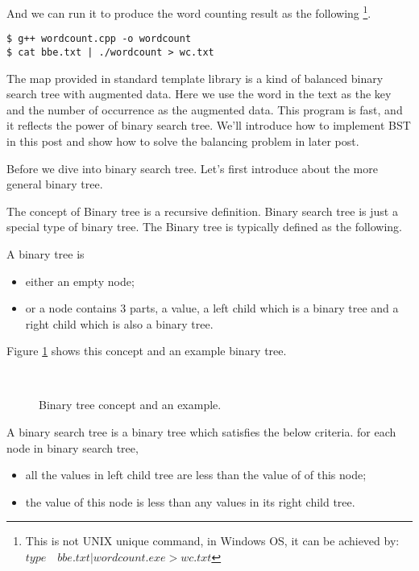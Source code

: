 \documentclass{article}
\begin{document}
And we can run it to produce the word counting result as the following
\footnote{This is not UNIX unique command, in Windows OS, it can be achieved
by: $type \quad bbe.txt | wordcount.exe > wc.txt$}.

\begin{verbatim}
$ g++ wordcount.cpp -o wordcount
$ cat bbe.txt | ./wordcount > wc.txt
\end{verbatim}

The map provided in standard template library is a kind of balanced binary search tree
with augmented data. Here we use the word in the text as the key and the number of
occurrence as the augmented data. This program is fast, and it reflects the power of
binary search tree. We'll introduce how to implement BST in this post and show how
to solve the balancing problem in later post.

Before we dive into binary search tree. Let's first introduce about
the more general binary tree.

The concept of Binary tree is a recursive definition. Binary search tree is just a special
type of binary tree. The Binary tree is typically defined as the following.

A binary tree is
\begin{itemize}
\item either an empty node;
\item or a node contains 3 parts, a value, a left child which is a binary tree and a
right child which is also a binary tree.
\end{itemize}

Figure \ref{fig:binary-tree-example} shows this concept and an example binary tree.

\begin{figure}[htbp]
  \centering
   \\
  \caption{Binary tree concept and an example.}
  \label{fig:binary-tree-example}
\end{figure}

A binary search tree is a binary tree which satisfies the below criteria.
for each node in binary search tree,
\begin{itemize}
\item all the values in left child tree are less than the value of of this node;
\item the value of this node is less than any values in its right child tree.
\end{itemize}
\end{document}
